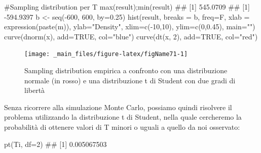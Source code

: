 \documentclass[a4paper,12pt,oneside]{book}
\newenvironment{Shaded}{}{}
\newcommand{\KeywordTok}[1]{#1}
\newcommand{\DataTypeTok}[1]{#1}
\newcommand{\DecValTok}[1]{#1}
\newcommand{\FloatTok}[1]{#1}
\newcommand{\StringTok}[1]{#1}
\newcommand{\CommentTok}[1]{#1}
\newcommand{\OtherTok}[1]{#1}
\newcommand{\OperatorTok}[1]{#1}
\newcommand{\NormalTok}[1]{#1}
\begin{document}
\begin{Shaded}
\begin{Highlighting}[]
\CommentTok{#Sampling distribution per T }
\KeywordTok{max}\NormalTok{(result);}\KeywordTok{min}\NormalTok{(result)}
\CommentTok{## [1] 545.0709}
\CommentTok{## [1] -594.9397}
\NormalTok{b <-}\StringTok{ }\KeywordTok{seq}\NormalTok{(}\OperatorTok{-}\DecValTok{600}\NormalTok{, }\DecValTok{600}\NormalTok{, }\DataTypeTok{by=}\FloatTok{0.25}\NormalTok{)}
\KeywordTok{hist}\NormalTok{(result, }\DataTypeTok{breaks =}\NormalTok{ b, }\DataTypeTok{freq=}\NormalTok{F, }
  \DataTypeTok{xlab =} \KeywordTok{expression}\NormalTok{(}\KeywordTok{paste}\NormalTok{(m)), }\DataTypeTok{ylab=}\StringTok{"Density"}\NormalTok{, }
  \DataTypeTok{xlim=}\KeywordTok{c}\NormalTok{(}\OperatorTok{-}\DecValTok{10}\NormalTok{,}\DecValTok{10}\NormalTok{), }\DataTypeTok{ylim=}\KeywordTok{c}\NormalTok{(}\DecValTok{0}\NormalTok{,}\FloatTok{0.45}\NormalTok{), }\DataTypeTok{main=}\StringTok{""}\NormalTok{)}
\KeywordTok{curve}\NormalTok{(}\KeywordTok{dnorm}\NormalTok{(x), }\DataTypeTok{add=}\OtherTok{TRUE}\NormalTok{, }\DataTypeTok{col=}\StringTok{"blue"}\NormalTok{)}
\KeywordTok{curve}\NormalTok{(}\KeywordTok{dt}\NormalTok{(x, }\DecValTok{2}\NormalTok{), }\DataTypeTok{add=}\OtherTok{TRUE}\NormalTok{, }\DataTypeTok{col=}\StringTok{"red"}\NormalTok{)}
\end{Highlighting}
\end{Shaded}

\begin{figure}

{\centering \texttt{[image: \_main\_files/figure-latex/figName71-1]} 

}

\caption{Sampling distribution empirica a confronto con una distribuzione normale (in rosso) e una distribuzione t di Student con due gradi di libertà}\label{fig:figName71}
\end{figure}

Senza ricorrere alla simulazione Monte Carlo, possiamo quindi risolvere il problema utilizzando la distribuzione t di Student, nella quale cercheremo la probabilità di ottenere valori di T minori o uguali a quello da noi osservato:

\begin{Shaded}
\begin{Highlighting}[]
\KeywordTok{pt}\NormalTok{(Ti, }\DataTypeTok{df=}\DecValTok{2}\NormalTok{)}
\CommentTok{## [1] 0.005067503}
\end{Highlighting}
\end{Shaded}
\end{document}
